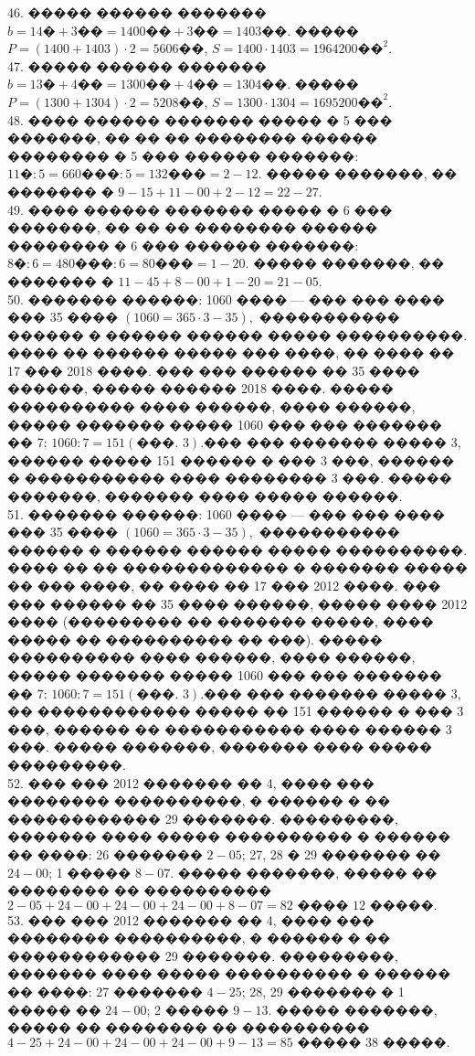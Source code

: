 \documentclass[12pt]{article}
\begin{document}
46. ����� ������ ������� $b=14\text{�}+3\text{��}=1400\text{��}+3\text{��}=1403\text{��}.$ ����� $P=(1400+1403)\cdot2=5606$��, $S=1400\cdot1403=1964200\text{��}^2.$\\
47. ����� ������ ������� $b=13\text{�}+4\text{��}=1300\text{��}+4\text{��}=1304\text{��}.$ ����� $P=(1300+1304)\cdot2=5208$��, $S=1300\cdot1304=1695200\text{��}^2.$\\
48. ���� ������ ������� ����� � 5 ��� �������, �� �� �� �������� ������ �������� � 5 ��� ������ �������: $11\text{�}:5=660\text{���}:5=132\text{���}=2-12.$ ����� �������, �� ������� � $9-15+11-00+2-12=22-27.$\\
49. ���� ������ ������� ����� � 6 ��� �������, �� �� �� �������� ������ �������� � 6 ��� ������ �������: $8\text{�}:6=480\text{���}:6=80\text{���}=1-20.$ ����� �������, �� ������� � $11-45+8-00+1-20=21-05.$\\
50. ������� ������: 1060 ���� --- ��� ��� ���� ��� 35 ���� $(1060=365\cdot3-35),$ ����������� ������ � ������ ������ ����� ����������. ���� �� ������ ����� ��� ����, �� ���� �� 17 ��� 2018 ����. ��� ��� ������ �� 35 ���� ������, ����� ������ 2018 ����. ����� ���������� ���� ������, ���� ������, ����� ������� ����� 1060 ��� ��� ������� �� 7: $1060:7=151 (\text{���. } 3).$��� ��� ������� ����� 3, ������ ����� 151 ������ � ��� 3 ���, ������ � ����������� ���� �������� 3 ���. ����� �������, ������� ���� ����� ������.\\
51. ������� ������: 1060 ���� --- ��� ��� ���� ��� 35 ���� $(1060=365\cdot3-35),$ ����������� ������ � ������ ������ ����� ����������. ���� �� �� ������������� � ������� ����� �� ��� ����, �� ���� �� 17 ��� 2012 ����. ��� ��� ������ �� 35 ���� ������, ����� ���� 2012 ���� (��������� �� ������� �����, ���� ����� �� ���������� �� ���). ����� ���������� ���� ������, ���� ������, ����� ������� ����� 1060 ��� ��� ������� �� 7: $1060:7=151 (\text{���. } 3).$��� ��� ������� ����� 3, �� ������������ ����� �� 151 ������ � ��� 3 ���, ������ �� ����������� ���� ������ 3 ���. ����� �������, ������� ���� ����� ���������.\\
52. ��� ��� 2012 ������� �� 4, ���� ��� �������� ����������, � ������ � �� ������������ 29 �������. ���������, ������� ���� ����� ���������� � ������ �� ����: 26 ������� $2-05$; 27, 28 � 29 ������� �� $24-00$; 1 ����� $8-07.$ ����� �������, ����� �� �������� �� ���������� $2-05+24-00+24-00+24-00+8-07=82\text{ ���� }12\text{ �����.}$\\
53. ��� ��� 2012 ������� �� 4, ���� ��� �������� ����������, � ������ � �� ������������ 29 �������. ���������, ������� ���� ����� ���������� � ������ �� ����: 27 ������� $4-25$; 28, 29 ������� � 1 ����� �� $24-00$; 2 ����� $9-13.$ ����� �������, ����� �� �������� �� ���������� $4-25+24-00+24-00+24-00+9-13=85\text{ ����� }38\text{ �����.}$\\
\end{document}
